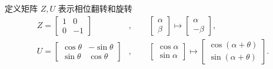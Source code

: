 \documentclass[a4paper,11pt,onecolumn,twoside]{article}
\begin{document}
定义矩阵 $Z,U$ 表示相位翻转和旋转 \begin{align}
    Z=\begin{bmatrix}
          1 & 0  \\
          0 & -1
      \end{bmatrix}           & ,\qquad
    \begin{bmatrix}
        \alpha \\\beta
    \end{bmatrix}\mapsto
    \begin{bmatrix}
        \alpha \\-\beta
    \end{bmatrix},                      \\
    U=\begin{bmatrix}
          \cos\theta & -\sin\theta \\
          \sin\theta & \cos\theta
      \end{bmatrix} & ,\qquad
    \begin{bmatrix}
        \cos\alpha \\\sin\alpha
    \end{bmatrix}\mapsto
    \begin{bmatrix}
        \cos(\alpha+\theta) \\\sin(\alpha+\theta)
    \end{bmatrix}.
\end{align}
\end{document}

